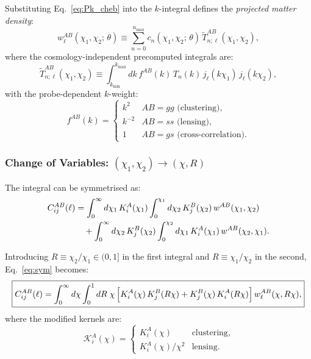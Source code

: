 Substituting Eq.~\eqref{eq:Pk_cheb} into the $k$-integral defines the
\emph{projected matter density}:
\begin{equation}
    w^{AB}_\ell(\chi_1,\chi_2;\,\theta) \equiv
    \sum_{n=0}^{n_{\max}} c_n(\chi_1,\chi_2;\,\theta)\,
    \tilde{T}^{AB}_{n;\ell}(\chi_1,\chi_2),
    \label{eq:w_ell}
\end{equation}
where the cosmology-independent precomputed integrals are:
\begin{equation}
    \tilde{T}^{AB}_{n;\ell}(\chi_1,\chi_2) \equiv
    \int_{k_{\min}}^{k_{\max}} dk\, f^{AB}(k)\,T_n(k)\,
    j_\ell(k\chi_1)\,j_\ell(k\chi_2),
    \label{eq:T_tilde}
\end{equation}
with the probe-dependent $k$-weight:
\begin{equation}
    f^{AB}(k) =
    \begin{cases}
        k^2  & AB = gg\text{ (clustering)}, \\
        k^{-2} & AB = ss\text{ (lensing)}, \\
        1    & AB = gs\text{ (cross-correlation)}.
    \end{cases}
    \label{eq:f_AB}
\end{equation}

\subsubsection{Change of Variables: $(\chi_1,\chi_2) \to (\chi,R)$}

The integral can be symmetrised as:
\begin{align}
    C^{AB}_{ij}(\ell) &=
    \int_0^\infty d\chi_1\, K^A_i(\chi_1)
    \int_0^{\chi_1} d\chi_2\, K^B_j(\chi_2)\, w^{AB}(\chi_1,\chi_2) \notag\\
    &\quad +
    \int_0^\infty d\chi_2\, K^B_j(\chi_2)
    \int_0^{\chi_2} d\chi_1\, K^A_i(\chi_1)\, w^{AB}(\chi_2,\chi_1).
    \label{eq:sym}
\end{align}

Introducing $R \equiv \chi_2/\chi_1 \in (0,1]$ in the first integral and
$R \equiv \chi_1/\chi_2$ in the second, Eq.~\eqref{eq:sym} becomes:
\begin{equation}
    \boxed{C^{AB}_{ij}(\ell) =
    \int_0^\infty d\chi
    \int_0^1 dR\;\chi\,
    \Bigl[K^A_i(\chi)\,K^B_j(R\chi) + K^B_j(\chi)\,K^A_i(R\chi)\Bigr]\,
    w^{AB}_\ell(\chi,R\chi),}
    \label{eq:Cl_chiR}
\end{equation}
where the modified kernels are:
\begin{equation}
    \mathcal{K}^A_i(\chi) =
    \begin{cases}
        K^A_i(\chi)       & \text{clustering},\\
        K^A_i(\chi)/\chi^2 & \text{lensing}.
    \end{cases}
    \label{eq:kernel_mod}
\end{equation}

